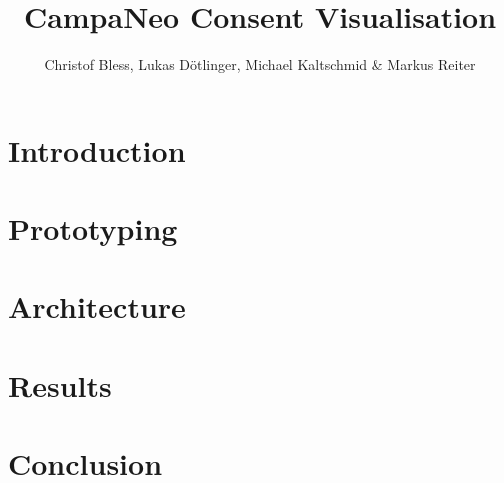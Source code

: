 \documentclass{article}
\title{CampaNeo Consent Visualisation}
\author{Christof Bless, Lukas Dötlinger, Michael Kaltschmid \& Markus Reiter}
\begin{document}
\maketitle

\newpage

\section{Introduction}
\label{sec:introduction}


\section{Prototyping}
\label{sec:prototyping}


\section{Architecture}
\label{sec:architecture}


\section{Results}
\label{sec:results}


\section{Conclusion}
\label{sec:conclusion}


\newpage
\printbibliography
\end{document}
